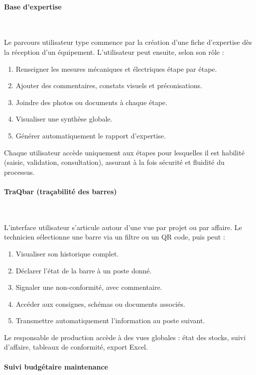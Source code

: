 \documentclass[11pt,a4paper]{article}
\begin{document}
\paragraph*{Base d’expertise} \

Le parcours utilisateur type commence par la création d’une fiche d’expertise dès la réception d’un équipement. L’utilisateur peut ensuite, selon son rôle :
\begin{enumerate}
    \item Renseigner les mesures mécaniques et électriques étape par étape.
    \item Ajouter des commentaires, constats visuels et préconisations.
    \item Joindre des photos ou documents à chaque étape.
    \item Visualiser une synthèse globale.
    \item Générer automatiquement le rapport d’expertise.
\end{enumerate}
Chaque utilisateur accède uniquement aux étapes pour lesquelles il est habilité (saisie, validation, consultation), assurant à la fois sécurité et fluidité du processus.

\paragraph*{TraQbar (traçabilité des barres)} \

L’interface utilisateur s’articule autour d’une vue par projet ou par affaire. Le technicien sélectionne une barre via un filtre ou un QR code, puis peut :
\begin{enumerate}
    \item Visualiser son historique complet.
    \item Déclarer l’état de la barre à un poste donné.
    \item Signaler une non-conformité, avec  commentaire.
    \item Accéder aux consignes, schémas ou documents associés.
    \item Transmettre automatiquement l’information au poste suivant.
\end{enumerate}
Le responsable de production accède à des vues globales : état des stocks, suivi d’affaire, tableaux de conformité, export Excel.

\paragraph*{Suivi budgétaire maintenance} \
\end{document}
